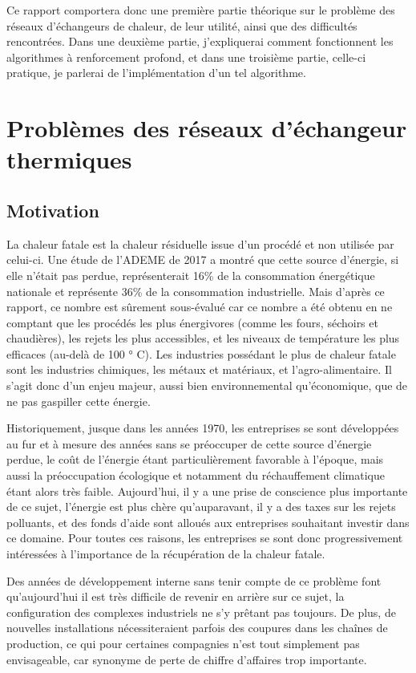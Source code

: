 Ce rapport comportera donc une première partie théorique sur le problème des réseaux d'échangeurs de chaleur, de leur utilité, ainsi que des difficultés rencontrées. Dans une deuxième partie, j'expliquerai comment fonctionnent les algorithmes à renforcement profond, et dans une troisième partie, celle-ci pratique, je parlerai de l'implémentation d'un tel algorithme. 

\section{Problèmes des réseaux d'échangeur thermiques}
\subsection{Motivation}

La chaleur fatale est la chaleur résiduelle issue d'un procédé et non utilisée par celui-ci. Une étude de l'ADEME de 2017 \cite{ademe} a montré que cette source d'énergie, si elle n'était pas perdue, représenterait 16\% de la consommation énergétique nationale et représente 36\% de la consommation industrielle. Mais d'après ce rapport, ce nombre est sûrement sous-évalué car ce nombre a été obtenu en ne comptant que les procédés les plus énergivores (comme les fours, séchoirs et chaudières), les rejets les plus accessibles, et les niveaux de température les plus efficaces (au-delà de 100 ° C). Les industries possédant le plus de chaleur fatale sont les industries chimiques, les métaux et matériaux, et l'agro-alimentaire. Il s'agit donc d'un enjeu majeur, aussi bien environnemental qu'économique, que de ne pas gaspiller cette énergie.

Historiquement, jusque dans les années 1970, les entreprises se sont développées au fur et à mesure des années sans se préoccuper de cette source d'énergie perdue, le coût de l'énergie étant particulièrement favorable à l'époque, mais aussi la préoccupation écologique et notamment du réchauffement climatique étant alors très faible. Aujourd'hui, il y a une prise de conscience plus importante de ce sujet, l'énergie est plus chère qu'auparavant, il y a des taxes sur les rejets polluants, et des fonds d'aide sont alloués aux entreprises souhaitant investir dans ce domaine. Pour toutes ces raisons, les entreprises se sont donc progressivement intéressées à l'importance de la récupération de la chaleur fatale.

Des années de développement interne sans tenir compte de ce problème font qu'aujourd'hui
il est très difficile de revenir en arrière sur ce sujet, la configuration des complexes industriels ne s'y prêtant pas toujours. De plus, de nouvelles installations nécessiteraient parfois des coupures dans les chaînes de production, ce qui pour certaines compagnies n'est tout simplement pas envisageable, car synonyme de perte de chiffre d'affaires trop importante.

